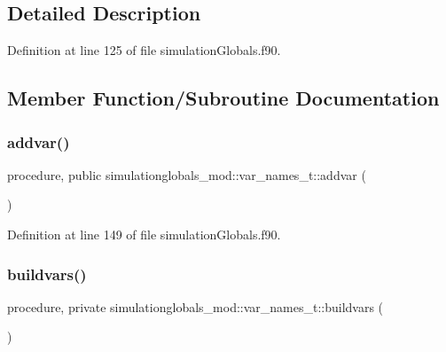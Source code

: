 \subsection{Detailed Description}


Definition at line 125 of file simulation\+Globals.\+f90.



\subsection{Member Function/\+Subroutine Documentation}
\mbox{\label{structsimulationglobals__mod_1_1var__names__t_ad8f0446f28faf00796d4952116484509}} 
\subsubsection{\texorpdfstring{addvar()}{addvar()}}
{\footnotesize\ttfamily procedure, public simulationglobals\+\_\+mod\+::var\+\_\+names\+\_\+t\+::addvar (\begin{DoxyParamCaption}{ }\end{DoxyParamCaption})}



Definition at line 149 of file simulation\+Globals.\+f90.

\mbox{\label{structsimulationglobals__mod_1_1var__names__t_a9a30996df58e3c94b86e6661291f4305}} 
\subsubsection{\texorpdfstring{buildvars()}{buildvars()}}
{\footnotesize\ttfamily procedure, private simulationglobals\+\_\+mod\+::var\+\_\+names\+\_\+t\+::buildvars (\begin{DoxyParamCaption}{ }\end{DoxyParamCaption})\hspace{0.3cm}{\ttfamily [private]}}




